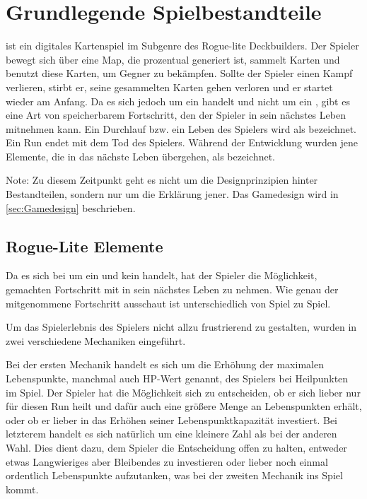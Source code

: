
\section{Grundlegende Spielbestandteile}\label{sec:grundlegenste-regeln}

\renewcommand{\kapitelautor}{Autor: Philip Jankovic}


%
\FF ist ein digitales Kartenspiel im Subgenre des Rogue-lite Deckbuilders.
Der Spieler bewegt sich über eine Map, die prozentual generiert ist, sammelt Karten und benutzt diese Karten,
um Gegner zu bekämpfen. Sollte der Spieler einen Kampf verlieren, stirbt er, seine gesammelten Karten
gehen verloren und er startet wieder am Anfang. Da es sich jedoch um ein  handelt und nicht um ein ,
gibt es eine Art von speicherbarem Fortschritt, den der Spieler in sein nächstes Leben mitnehmen kann.
Ein Durchlauf bzw. ein Leben des Spielers wird als  bezeichnet. Ein Run endet mit dem Tod des Spielers.
Während der Entwicklung wurden jene Elemente, die in das nächste Leben übergehen, als  bezeichnet.



\begin{infoBox}
    Note: Zu diesem Zeitpunkt geht es nicht um die Designprinzipien hinter Bestandteilen,
    sondern nur um die Erklärung jener. Das Gamedesign wird in \ref{sec:Gamedesign} beschrieben.
\end{infoBox}


\subsection{Rogue-Lite Elemente}\label{rogue_lite_elemente}

Da es sich bei \FF um ein  und kein  handelt, hat der Spieler die Möglichkeit, gemachten Fortschritt mit in sein nächstes Leben zu nehmen.
Wie genau der mitgenommene Fortschritt ausschaut ist unterschiedlich von Spiel zu Spiel.


Um das Spielerlebnis des Spielers nicht allzu frustrierend zu gestalten, wurden in \FF zwei verschiedene Mechaniken eingeführt.


Bei der ersten Mechanik handelt es sich um die Erhöhung der maximalen Lebenspunkte, manchmal auch HP-Wert genannt, des Spielers bei Heilpunkten im Spiel.
Der Spieler hat die Möglichkeit sich zu entscheiden, ob er sich lieber nur für diesen Run heilt und dafür auch eine größere Menge an Lebenspunkten erhält, oder ob er
lieber in das Erhöhen seiner Lebenspunktkapazität investiert. Bei letzterem handelt es sich natürlich um eine kleinere Zahl als bei der anderen Wahl.
Dies dient dazu, dem Spieler die Entscheidung offen zu halten, entweder etwas Langwieriges aber Bleibendes zu investieren oder lieber noch einmal ordentlich
Lebenspunkte aufzutanken, was bei der zweiten Mechanik ins Spiel kommt.

